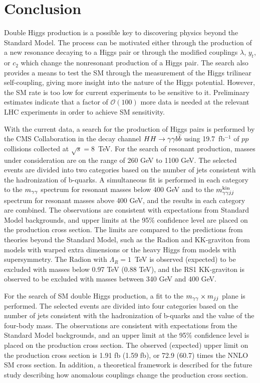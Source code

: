 
\chapter{Conclusion\label{ch:conclusion}}

Double Higgs production is a possible key to discovering physics beyond the Standard Model.
The process can be motivated either through the production of a new resonance decaying to
a Higgs pair or through the modified couplings $\lambda$, $y_t$, or $c_2$
which change the nonresonant production of a Higgs pair. The search also provides a means
to test the SM through the measurement of the Higgs trilinear self-coupling, giving
more insight into the nature of the Higgs potential. However, the SM rate is too low
for current experiments to be sensitive to it. Preliminary estimates indicate that a factor of
$\mathcal{O}(100)$ more data is needed at the relevant LHC experiments in order to achieve
SM sensitivity.

With the current data, a search for the production of Higgs pairs is performed
by the CMS Collaboration in the decay channel $HH \rightarrow \gamma\gamma b\bar{b}$ using 19.7~fb$^{-1}$
of $pp$ collisions collected at $\sqrt{s} = 8$~TeV.
For the search of resonant production, masses under consideration are on the range of 260 GeV
to 1100 GeV. The selected events are divided into two categories based on the number of jets
consistent with the hadronization of b-quarks.
A simultaneous fit is performed in each category to the $m_{\gamma\gamma}$ spectrum for resonant masses
below 400 GeV and to the $m_{\gamma\gamma jj}^{\rm kin}$ spectrum for resonant masses above 400 GeV, and the results
in each category are combined. The observations are consistent with expectations from Standard
Model backgrounds, and upper limits at the 95\% confidence level are placed on the production
cross section. The limits are compared to the predictions from theories beyond the Standard Model,
such as the Radion and KK-graviton from models with warped extra dimensions or the heavy Higgs
from models with supersymmetry. The Radion with $\Lambda_R = 1$~TeV is observed (expected) to be
excluded with masses below 0.97 TeV (0.88 TeV), and the RS1 KK-graviton is observed to be
excluded with masses between 340 GeV and 400 GeV.

For the search of SM double Higgs production, a fit to the $m_{\gamma\gamma} \times m_{jj}$ plane 
is performed. The selected events are divided into four categories based on the number of jets
consistent with the hadronization of b-quarks and the value of the four-body mass.
The observations are consistent with expectations from the Standard Model backgrounds, and an
upper limit at the 95\% confidence level is placed on the production cross section.
The observed (expected) upper limit on the production cross section is 1.91 fb (1.59 fb),
or 72.9 (60.7) times the NNLO SM cross section. In addition, a theoretical framework is described
for the future study describing how anomalous couplings change the production cross section.
